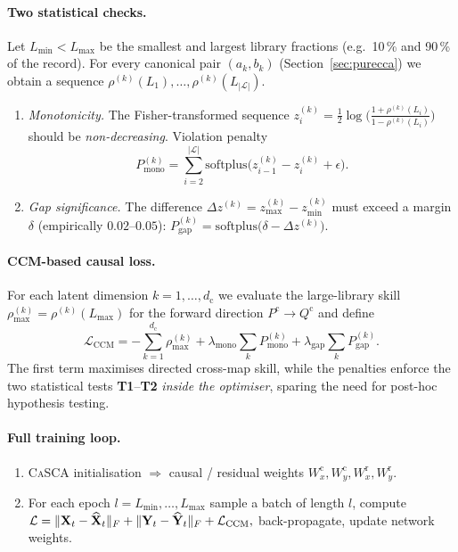 \documentclass[14pt]{extarticle}
\begin{document}
	\paragraph{Two statistical checks.}
	Let
	$L_{\min}\!<\!L_{\max}$ be the smallest and largest library
	fractions (e.g.\ 10\,\% and 90\,\% of the record).
	For every canonical pair $(a_k,b_k)$ (Section~\ref{sec:purecca}) we
	obtain a sequence
	$\rho^{(k)}(L_1),\dots,\rho^{(k)}(L_{|\mathcal L|})$.
	
	\begin{enumerate}[label=\textbf{T\arabic*}),leftmargin=1.5em,noitemsep]
		\item \textit{Monotonicity.}  
		The Fisher-transformed sequence
		$z^{(k)}_i=\tfrac12\log\!\bigl(\tfrac{1+\rho^{(k)}(L_i)}
		{1-\rho^{(k)}(L_i)}\bigr)$
		should be \emph{non-decreasing}.  Violation penalty
		\[
		P^{(k)}_{\text{mono}}
		= \sum_{i=2}^{|\mathcal L|}
		\mathrm{softplus}\!\bigl(z^{(k)}_{i-1}-z^{(k)}_{i}+\epsilon\bigr).
		\]
		\item \textit{Gap significance.}  
		The difference
		$\Delta z^{(k)} = z^{(k)}_{\max}-z^{(k)}_{\min}$ must exceed a margin
		$\delta$ (empirically $0.02$–$0.05$):
		$
		P^{(k)}_{\text{gap}}
		= \mathrm{softplus}\!\bigl(\delta-\Delta z^{(k)}\bigr).
		$
	\end{enumerate}
	
	\paragraph{CCM-based causal loss.}
	For each latent dimension $k\!=\!1,\dots,d_{\mathrm c}$ we evaluate the
	large-library skill
	$\rho^{(k)}_{\max}\!=\!\rho^{(k)}(L_{\max})$ for the forward direction
	$P^{\mathrm c}\!\to\!Q^{\mathrm c}$ and define
	\[
	\mathcal L_{\text{CCM}}
	= -\sum_{k=1}^{d_{\mathrm c}}\rho^{(k)}_{\max}
	+ \lambda_{\text{mono}}\sum_{k}P^{(k)}_{\text{mono}}
	+ \lambda_{\text{gap}}\sum_{k}P^{(k)}_{\text{gap}}.
	\]
	The first term maximises directed cross-map skill,
	while the penalties enforce the two statistical tests \textbf{T1}–\textbf{T2}
	\emph{inside the optimiser}, sparing the need for post-hoc
	hypothesis testing.
	
	\paragraph{Full training loop.}
	\begin{enumerate}[leftmargin=1.5em,noitemsep]
		\item \textsc{CaSCA} initialisation  
		$\Rightarrow$ causal / residual weights
		$W_x^{\mathrm c},W_y^{\mathrm c},W_x^{\mathrm r},W_y^{\mathrm r}$.
		\item For each epoch $l=L_{\min},\dots,L_{\max}$  
		sample a batch of length $l$, compute
		\(
		\mathcal L
		=\|\mathbf{X}_t-\widehat{\mathbf{X}}_t\|_F
		+\|\mathbf{Y}_t-\widehat{\mathbf{Y}}_t\|_F
		+\mathcal L_{\text{CCM}},
		\)
		back-propagate, update network weights.
	\end{enumerate}
	
\end{document}
